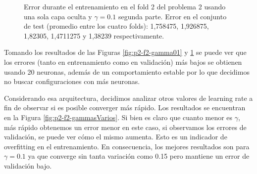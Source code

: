 \documentclass[informe.tex]{subfiles}
\begin{document}
\begin{figure}[H]
        \caption{Error durante el entrenamiento en el fold 2 del problema 2 usando una sola capa oculta y $\gamma=0.1$ segunda parte. Error en el conjunto de test (promedio entre los cuatro folds): 1,758475, 1,926875, 1,82305, 1,4711275 y 1,38239 respectivamente.}\label{fig:p2-f2-gamma01-segundaParte}
    \end{figure}
    
    
    Tomando los resultados de las Figuras \ref{fig:p2-f2-gamma01} y \ref{fig:p2-f2-gamma01-segundaParte} se puede ver que los errores (tanto en entrenamiento como en validaci\'on) m\'as bajos se obtienen usando 20 neuronas, además de un comportamiento estable por lo que decidimos no buscar configuraciones con más neuronas.
    
    Considerando esa arquitectura, decidimos analizar otros valores de learning rate a fin de observar si es posible converger más rápido. Los resultados se encuentran en la Figura \ref{fig:p2-f2-gammasVarios}. Si bien es claro que cuanto menor es $\gamma$, más rápido obtenemos un error menor en este caso, si observamos los errores de validación, se puede ver cómo el mismo aumenta. Esto es un indicador de overfitting en el entrenamiento. En consecuencia, los mejores resultados son para $\gamma=0.1$ ya que converge sin tanta variaci\'on como 0.15 pero mantiene un error de validaci\'on bajo.
    
\end{document}
